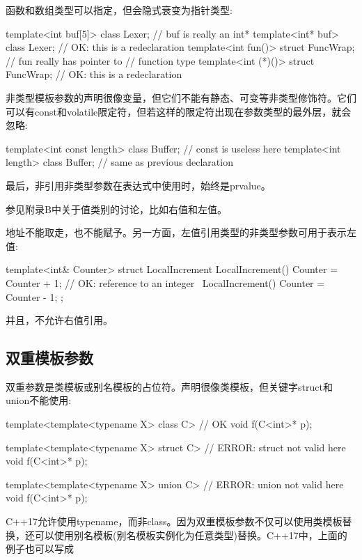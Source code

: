 函数和数组类型可以指定，但会隐式衰变为指针类型:

\begin{cpp}
template<int buf[5]> class Lexer; // buf is really an int*
template<int* buf> class Lexer; // OK: this is a redeclaration
template<int fun()> struct FuncWrap; // fun really has pointer to
								     // function type
template<int (*)()> struct FuncWrap; // OK: this is a redeclaration
\end{cpp}

非类型模板参数的声明很像变量，但它们不能有静态、可变等非类型修饰符。它们可以有const和volatile限定符，但若这样的限定符出现在参数类型的最外层，就会忽略:

\begin{cpp}
template<int const length> class Buffer; // const is useless here
template<int length> class Buffer; // same as previous declaration
\end{cpp}

最后，非引用非类型参数在表达式中使用时，始终是prvalue。 

\begin{notice}参见附录B中关于值类别的讨论，比如右值和左值。
\end{notice}

地址不能取走，也不能赋予。另一方面，左值引用类型的非类型参数可用于表示左值:

\begin{cpp}
template<int& Counter>
struct LocalIncrement {
	LocalIncrement() { Counter = Counter + 1; } // OK: reference to an integer
	~LocalIncrement() { Counter = Counter - 1; }
};
\end{cpp}

并且，不允许右值引用。

\subsection{双重模板参数}

双重参数是类模板或别名模板的占位符。声明很像类模板，但关键字struct和union不能使用:

\begin{cpp}
template<template<typename X> class C> // OK
void f(C<int>* p);

template<template<typename X> struct C> // ERROR: struct not valid here
void f(C<int>* p);

template<template<typename X> union C> // ERROR: union not valid here
void f(C<int>* p);
\end{cpp}

C++17允许使用typename，而非class。因为双重模板参数不仅可以使用类模板替换，还可以使用别名模板(别名模板实例化为任意类型)替换。C++17中，上面的例子也可以写成

